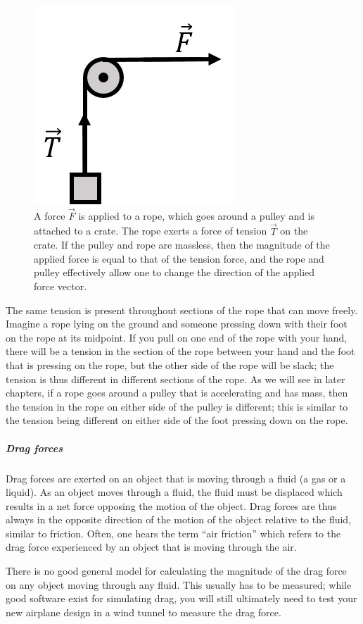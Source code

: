 \begin{figure}[!htbp]
\centering
\includegraphics[width=0.25\linewidth]{files/tension-50cd74b547f7e6f7a2b794042bd9b27a.png}
\caption[]{A force $\vec F$ is applied to a rope, which goes around a pulley and is attached to a crate. The rope exerts a force of tension $\vec T$ on the crate. If the pulley and rope are massless, then the magnitude of the applied force is equal to that of the tension force, and the rope and pulley effectively allow one to change the direction of the applied force vector.}
\label{fig:newtonslaws:tension}
\end{figure}

The same tension is present throughout sections of the rope that can move freely. Imagine a rope lying on the ground and someone pressing down with their foot on the rope at its midpoint. If you pull on one end of the rope with your hand, there will be a tension in the section of the rope between your hand and the foot that is pressing on the rope, but the other side of the rope will be slack; the tension is thus different in different sections of the rope. As we will see in later chapters, if a rope goes around a pulley that is accelerating and has mass, then the tension in the rope on either side of the pulley is different; this is similar to the tension being different on either side of the foot pressing down on the rope.

\subparagraph{Drag forces}

Drag forces are exerted on an object that is moving through a fluid (a gas or a liquid). As an object moves through a fluid, the fluid must be displaced which results in a net force opposing the motion of the object. Drag forces are thus always in the opposite direction of the motion of the object relative to the fluid, similar to friction. Often, one hears the term ``air friction'' which refers to the drag force experienced by an object that is moving through the air.

There is no good general model for calculating the magnitude of the drag force on any object moving through any fluid. This usually has to be measured; while good software exist for simulating drag, you will still ultimately need to test your new airplane design in a wind tunnel to measure the drag force.

